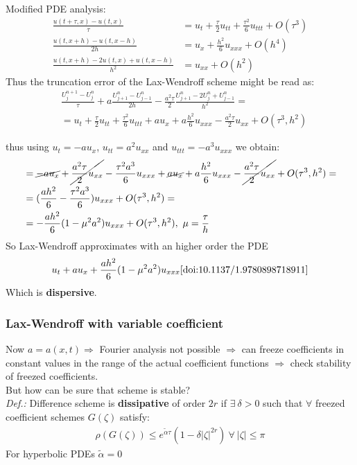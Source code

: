 \documentclass{beamer}
\begin{document}
\begin{frame}
Modified PDE analysis:
\begin{align*}
\frac{u(t+\tau,x) - u(t,x)}{\tau} & = u_t + \frac{\tau}{2}u_{tt} + \frac{\tau^2}{6}u_{ttt} + O(\tau^3) \\
\frac{u(t,x + h) - u(t,x-h)}{2h} & = u_x + \frac{h^2}{6}u_{xxx} + O(h^4) \\
\frac{u(t,x+h) - 2u(t,x) + u(t,x-h)}{h^2} & = u_{xx} + O(h^2)
\end{align*}
Thus the truncation error of the Lax-Wendroff scheme might be read as:
\begin{align*}
& \frac{U_j^{n+1} - U_j^n}{\tau} + a \frac{U_{j+1}^n -U_{j-1}^n}{2h} -\frac{a^2\tau}{2}\frac{U_{j+1}^n -2U_j^n+U_{j-1}^n}{h^2} = \\
& = u_t + \frac{\tau}{2}u_{tt} + \frac{\tau^2}{6}u_{ttt} + au_x + a\frac{h^2}{6}u_{xxx} - \frac{a^2\tau}{2} u_{xx} + O(\tau^3,h^2)
\end{align*}
\end{frame}
\begin{frame}
thus using $u_t = -au_x$, $u_{tt} = a^2u_{xx}$ and $u_{ttt} = -a^3u_{xxx}$ we obtain:
\begin{align*}
& = \cancel{-au_x} + \cancel{\frac{a^2\tau}{2}u_{xx}} -\frac{\tau^2a^3}{6}u_{xxx} + \cancel{au_x} + a\frac{h^2}{6}u_{xxx} - \cancel{\frac{a^2\tau}{2} u_{xx}} + O(\tau^3,h^2) = \\
& = (\frac{ah^2}{6} - \frac{\tau^2a^3}{6})u_{xxx} + O(\tau^3,h^2) = \\
& = -\frac{ah^2}{6}(1-\mu^2a^2)u_{xxx} + O(\tau^3,h^2), \ \mu = \frac{\tau}{h}
\end{align*}
So Lax-Wendroff approximates with an higher order the PDE
\begin{align*}
u_t + au_x +\frac{ah^2}{6}(1-\mu^2a^2)u_{xxx}
\cite{doi:10.1137/1.9780898718911}
\end{align*}
Which is \textbf{dispersive}.
\end{frame}
\begin{frame}
\frametitle{Lax-Wendroff with variable coefficient}
Now $a = a(x,t) \Rightarrow$ Fourier analysis not possible $\Rightarrow$ can freeze coefficients in constant values in the range of
the actual coefficient functions $\Rightarrow$ check stability of freezed coefficients. \\
But how can be sure that scheme is stable? \\
\textit{Def.:} Difference scheme is \textbf{dissipative} of order $2r$ if $\exists \ \delta > 0$ such that $\forall$ freezed coefficient schemes $G(\zeta)$ satisfy:
\begin{align*}
\rho(G(\zeta)) \leq e^{\tilde{\alpha}\tau}(1-\delta|\zeta|^{2r}) \ \forall \ |\zeta| \leq \pi
\end{align*}
For hyperbolic PDEs $\tilde{\alpha} = 0$
\end{frame}
\end{document}
